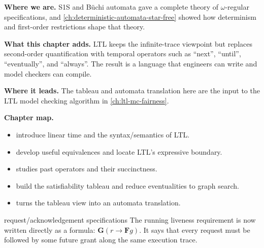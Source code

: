 \begin{chapteropening}
\textbf{Where we are.}  S1S and B\"uchi automata gave a complete theory of
$\omega$-regular specifications, and \cref{ch:deterministic-automata-star-free}
showed how determinism and first-order restrictions shape that theory.

\textbf{What this chapter adds.}  LTL keeps the infinite-trace viewpoint but
replaces second-order quantification with temporal operators such as
``next'', ``until'', ``eventually'', and ``always''.  The result is a language
that engineers can write and model checkers can compile.

\textbf{Where it leads.}  The tableau and automata translation here are the
input to the LTL model checking algorithm in \cref{ch:ltl-mc-fairness}.

\textbf{Chapter map.}
\begin{itemize}[nosep]
  \item {} introduce linear time and the
        syntax/semantics of LTL.
  \item {} develop useful
        equivalences and locate LTL's expressive boundary.
  \item {} studies past operators and their succinctness.
  \item {} build the satisfiability
        tableau and reduce eventualities to graph search.
  \item {} turns the tableau view into an automata
        translation.
\end{itemize}
\end{chapteropening}


\begin{runningexample}{request/acknowledgement specifications}
The running liveness requirement is now written directly as a formula:
$\mathbf{G}(r \rightarrow \mathbf{F}g)$.  It says that every request must be
followed by some future grant along the same execution trace.
\end{runningexample}

